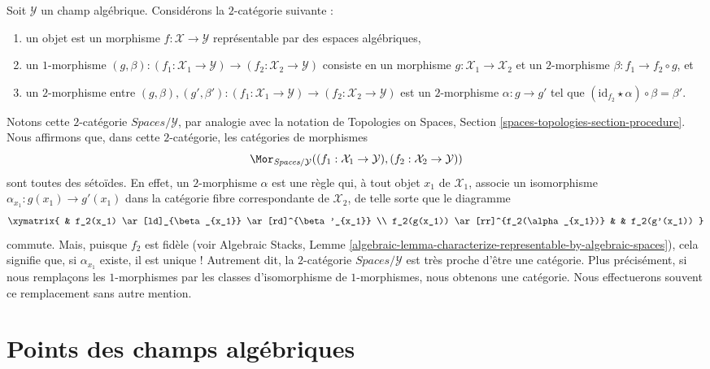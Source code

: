 \begin{remark}
\label{remark-representable-over}
Soit $\mathcal{Y}$ un champ algébrique. Considérons la
$2$-catégorie suivante :
\begin{enumerate}
\item un objet est un morphisme $f : \mathcal{X} \to \mathcal{Y}$
représentable par des espaces algébriques,
\item un $1$-morphisme
$(g, \beta) :
(f_1 : \mathcal{X}_1 \to \mathcal{Y})
\to
(f_2 : \mathcal{X}_2 \to \mathcal{Y})$
consiste en un morphisme $g : \mathcal{X}_1 \to \mathcal{X}_2$ et un
$2$-morphisme $\beta : f_1 \to f_2 \circ g$, et
\item un $2$-morphisme entre
$(g, \beta), (g', \beta') :
(f_1 : \mathcal{X}_1 \to \mathcal{Y})
\to
(f_2 : \mathcal{X}_2 \to \mathcal{Y})$
est un $2$-morphisme $\alpha : g \to g'$ tel que
$(\text{id}_{f_2} \star \alpha) \circ \beta = \beta'$.
\end{enumerate}
Notons cette $2$-catégorie $\textit{Spaces}/\mathcal{Y}$, par
analogie avec la notation de
Topologies on Spaces, Section \ref{spaces-topologies-section-procedure}.
Nous affirmons que, dans cette $2$-catégorie, les catégories de morphismes
$$
\Mor_{\textit{Spaces}/\mathcal{Y}}(
(f_1 : \mathcal{X}_1 \to \mathcal{Y}),
(f_2 : \mathcal{X}_2 \to \mathcal{Y}))
$$
sont toutes des sétoïdes. En effet, un $2$-morphisme $\alpha$ est une règle qui, à tout
objet $x_1$ de $\mathcal{X}_1$, associe un isomorphisme
$\alpha_{x_1} : g(x_1) \longrightarrow g'(x_1)$
dans la catégorie fibre correspondante de $\mathcal{X}_2$, de telle sorte que le diagramme
$$
\xymatrix{
& f_2(x_1) \ar[ld]_{\beta_{x_1}} \ar[rd]^{\beta'_{x_1}} \\
f_2(g(x_1)) \ar[rr]^{f_2(\alpha_{x_1})} & &
f_2(g'(x_1))
}
$$
commute. Mais, puisque $f_2$ est fidèle (voir
Algebraic Stacks,
Lemme \ref{algebraic-lemma-characterize-representable-by-algebraic-spaces}),
cela signifie que, si $\alpha_{x_1}$ existe, il est unique ! Autrement dit, la
$2$-catégorie $\textit{Spaces}/\mathcal{Y}$ est très proche d'être
une catégorie. Plus précisément, si nous remplaçons les $1$-morphismes par les classes
d'isomorphisme de $1$-morphismes, nous obtenons une catégorie. Nous effectuerons souvent
ce remplacement sans autre mention.
\end{remark}




\section{Points des champs algébriques}
\label{section-points}

